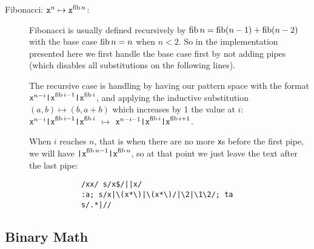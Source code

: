 \begin{description}
	\item[Fibonacci: $\texttt{x}^n\mapsto \texttt{x}^{\mathop{\mathrm{fib}} n}$:]

		Fibonacci is usually defined recursively by $\mathop{\mathrm{fib}} n = \mathop{\mathrm{fib}} (n-1) +
		\mathop{\mathrm{fib}} (n-2)$ with the base case $\mathop{\mathrm{fib}} n = n$ when $n<2$.  So in the
		implementation presented here we first handle the base case first by
		not adding pipes (which disables all substitutions on the following
		lines).

		The recursive case is handling by having our pattern space with the
		format $\texttt{x}^{n-i}\texttt{|x}^{\mathop{\mathrm{fib}} i-1}\texttt{|x}^{\mathop{\mathrm{fib}} i}$,
		and applying the inductive substitution $(a,b)\mapsto (b,a+b)$
		which increases by 1 the value at $i$:
		$\texttt{x}^{n-i}\texttt{|x}^{\mathop{\mathrm{fib}} i-1}\texttt{|x}^{\mathop{\mathrm{fib}} i}$
		$\mapsto$
		$\texttt{x}^{n-i-1}\texttt{|x}^{\mathop{\mathrm{fib}} i}\texttt{|x}^{\mathop{\mathrm{fib}} i+1}$.

		When $i$ reaches $n$, that is when there are no more {\tt x}s before
		the first pipe, we will have $\texttt{|x}^{\mathop{\mathrm{fib}} n-1}\texttt{|x}^{\mathop{\mathrm{fib}} n}$,
		so at that point we just leave the text after the last pipe:

		\begin{Verbatim}
			/xx/ s/x$/||x/
			:a; s/x|\(x*\)|\(x*\)/|\2|\1\2/; ta
			s/.*|//
		\end{Verbatim}

\end{description}

\subsection{Binary Math}

